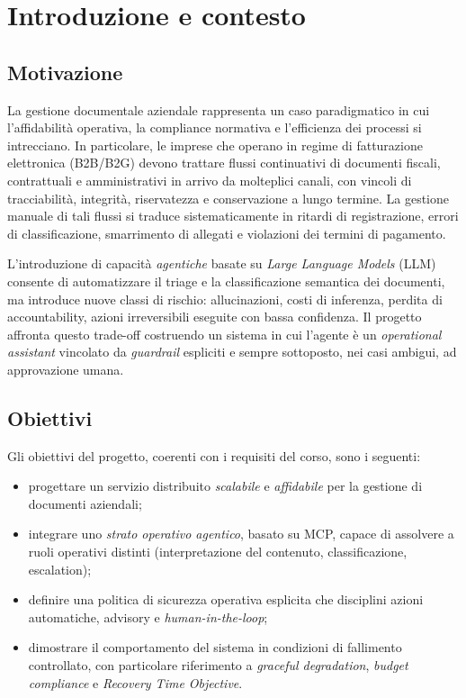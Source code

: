 \chapter{Introduzione e contesto}
\label{chap:introduzione}

\section{Motivazione}
\label{sec:motivazione}

La gestione documentale aziendale rappresenta un caso paradigmatico in cui
l'affidabilit\`a operativa, la compliance normativa e l'efficienza dei processi
si intrecciano. In particolare, le imprese che operano in regime di fatturazione
elettronica (B2B/B2G) devono trattare flussi continuativi di documenti
fiscali, contrattuali e amministrativi in arrivo da molteplici canali, con
vincoli di tracciabilit\`a, integrit\`a, riservatezza e conservazione a lungo
termine. La gestione manuale di tali flussi si traduce sistematicamente in
ritardi di registrazione, errori di classificazione, smarrimento di allegati e
violazioni dei termini di pagamento.

L'introduzione di capacit\`a \emph{agentiche} basate su \emph{Large Language Models}
(LLM) consente di automatizzare il triage e la classificazione semantica dei
documenti, ma introduce nuove classi di rischio: allucinazioni, costi di
inferenza, perdita di accountability, azioni irreversibili eseguite con bassa
confidenza. Il progetto affronta questo trade-off costruendo un sistema in cui
l'agente \`e un \emph{operational assistant} vincolato da \emph{guardrail}
espliciti e sempre sottoposto, nei casi ambigui, ad approvazione umana.

\section{Obiettivi}
\label{sec:obiettivi}

Gli obiettivi del progetto, coerenti con i requisiti del corso, sono i seguenti:

\begin{itemize}[leftmargin=*]
    \item progettare un servizio distribuito \emph{scalabile} e \emph{affidabile}
          per la gestione di documenti aziendali;
    \item integrare uno \emph{strato operativo agentico}, basato su MCP, capace
          di assolvere a ruoli operativi distinti (interpretazione del contenuto,
          classificazione, escalation);
    \item definire una politica di sicurezza operativa esplicita che disciplini
          azioni automatiche, advisory e \emph{human-in-the-loop};
    \item dimostrare il comportamento del sistema in condizioni di fallimento
          controllato, con particolare riferimento a \emph{graceful degradation},
          \emph{budget compliance} e \emph{Recovery Time Objective}.
\end{itemize}

